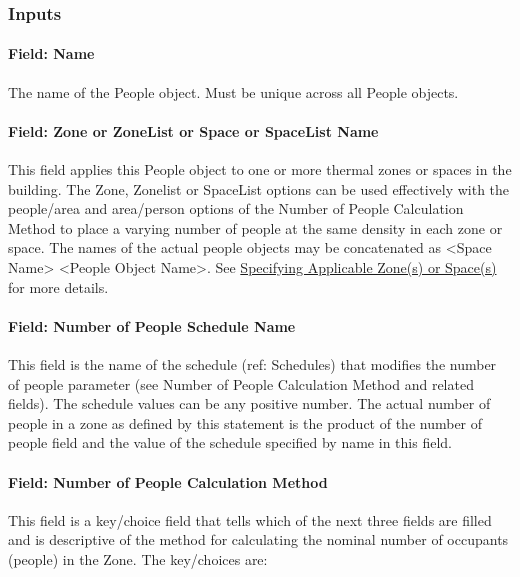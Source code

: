 \subsubsection{Inputs}\label{inputs-025}

\paragraph{Field: Name}\label{field-name-024}

The name of the People object. Must be unique across all People objects.

\paragraph{Field: Zone or ZoneList or Space or SpaceList Name}\label{field-zone-or-zonelist-name-000}

This field applies this People object to one or more thermal zones or spaces in the building. The Zone, Zonelist or SpaceList options can be used effectively with the people/area and area/person options of the Number of People Calculation Method to place a varying number of people at the same density in each zone or space. The names of the actual people objects may be concatenated as \textless{}Space Name\textgreater{} \textless{}People Object Name\textgreater{}. See \hyperref[specifying-applicable-zones-or-spaces]{Specifying Applicable Zone(s) or Space(s)} for more details.

\paragraph{Field: Number of People Schedule Name}\label{field-number-of-people-schedule-name}

This field is the name of the schedule (ref: Schedules) that modifies the number of people parameter (see Number of People Calculation Method and related fields). The schedule values can be any positive number. The actual number of people in a zone as defined by this statement is the product of the number of people field and the value of the schedule specified by name in this field.

\paragraph{Field: Number of People Calculation Method}\label{field-number-of-people-calculation-method}

This field is a key/choice field that tells which of the next three fields are filled and is descriptive of the method for calculating the nominal number of occupants (people) in the Zone. The key/choices are:

